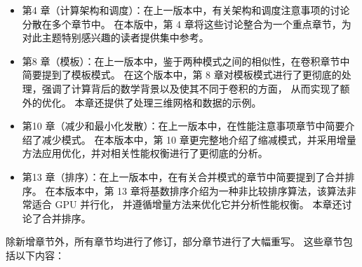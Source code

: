 \begin{itemize}
	\item 第4 章（计算架构和调度）：在上一版本中，有关架构和调度注意事项的讨论分散在多个章节中。 
		在本版中，第 4 章将这些讨论整合为一个重点章节，为对此主题特别感兴趣的读者提供集中参考。

	\item 第8 章（模板）：在上一版本中，鉴于两种模式之间的相似性，在卷积章节中简要提到了模板模式。 
		在这个版本中，第 8 章对模板模式进行了更彻底的处理，强调了计算背后的数学背景以及使其不同于卷积的方面，
		从而实现了额外的优化。 本章还提供了处理三维网格和数据的示例。

	\item 第10 章（减少和最小化发散）：在上一版本中，在性能注意事项章节中简要介绍了减少模式。 
		在本版本中，第 10 章更完整地介绍了缩减模式，并采用增量方法应用优化，并对相关性能权衡进行了更彻底的分析。

	\item 第13 章（排序）：在上一版本中，在有关合并模式的章节中简要提到了合并排序。 
		在本版本中，第 13 章将基数排序介绍为一种非比较排序算法，该算法非常适合 GPU 并行化，
		并遵循增量方法来优化它并分析性能权衡。 本章还讨论了合并排序。
\end{itemize}

除新增章节外，所有章节均进行了修订，部分章节进行了大幅重写。 这些章节包括以下内容：

